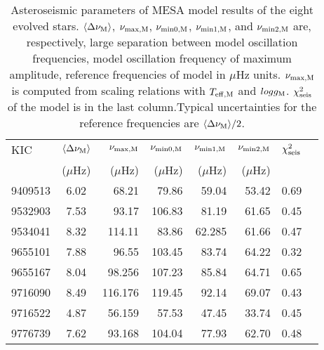 \documentclass[a4paper,fleqn,usenatbib]{mnras}     %
\def\braket#1{\left<#1\right>}
\begin{document}
{\begin{table*}
        \caption{Asteroseismic parameters of {\small MESA} model results of the eight evolved stars.
                  ${\braket{\Delta{\nu_{\rm M}}}}$, ${\nu_{\rm max,M}}$,
                 ${\nu_{\rm min0,M}}$, ${\nu_{\rm min1,M}}$, and ${\nu_{\rm min2,M}}$ are, respectively, large separation between model oscillation frequencies,
                 model oscillation frequency of maximum amplitude, reference frequencies of model in $\mu$Hz units. ${\nu_{\rm max,M}}$ is computed from scaling relations with
                 ${T_{\rm eff,M}}$ and ${logg_{\rm M}}$. ${{\chi^2_{\rm seis}}}$ of the model is in the last column.Typical uncertainties for the reference frequencies are ${\braket{\Delta{\nu_{\rm M}}}}/2$. }
        \begin{tabular}{lcrrrrrr}
                \hline
         KIC   & ${\braket{\Delta{\nu_{\rm M}}}}$ & ${\nu_{\rm max,M}}$ & ${\nu_{\rm min0,M}}$ &
          ${\nu_{\rm min1,M}}$ & ${\nu_{\rm min2,M}}$& ${{\chi^2_{\rm seis}}}$ \\
         & ($\mu$Hz) & ($\mu$Hz) & ($\mu$Hz) & ($\mu$Hz) & ($\mu$Hz) &  \\
                \hline
9409513&6.02&68.21&79.86&59.04&53.42&0.69\\
9532903&7.53&93.17&106.83&81.19&61.65&0.45\\
9534041&8.32&114.11&83.86&62.285&61.66&0.47\\
9655101&7.88&96.55&103.45&83.74&64.22&0.32\\
9655167&8.04&98.256&107.23&85.84&64.71&0.65\\
9716090&8.49&116.176&119.45&92.14&69.07&0.43\\
9716522&4.87&56.159&57.53&47.45&33.74&0.45\\
9776739&7.62&93.168&104.04&77.93&62.70&0.48\\

                \hline
        \end{tabular}
\end{table*}

}
\end{document}
